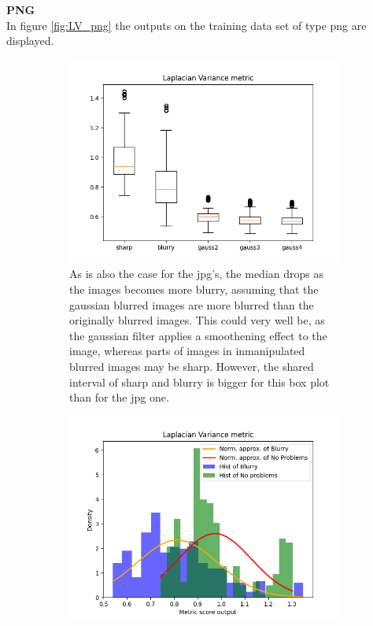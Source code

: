 \textbf{PNG}\\
In figure \ref{fig:LV_png} the outputs on the training data set of type png are displayed.

\begin{figure}[H]
    \centering
    \begin{subfigure}[t]{0.48\textwidth}
        \includegraphics[width=\textwidth]{Figures/lv/output_boxplot_lv_png.png}
        \caption{As is also the case for the jpg's, the median drops as the images becomes more blurry, assuming that the gaussian blurred images are more blurred than the originally blurred images. This could very well be, as the gaussian filter applies a smoothening effect to the image, whereas parts of images in inmanipulated blurred images may be sharp. However, the shared interval of sharp and blurry is bigger for this box plot than for the jpg one.}
        \label{fig:LV_roc}
    \end{subfigure}\hspace{1em}
    \begin{subfigure}[t]{0.48\textwidth}
	    \includegraphics[width=\textwidth]{Figures/lv/output_dens_lv_png.png}

\end{subfigure}
\end{figure}
